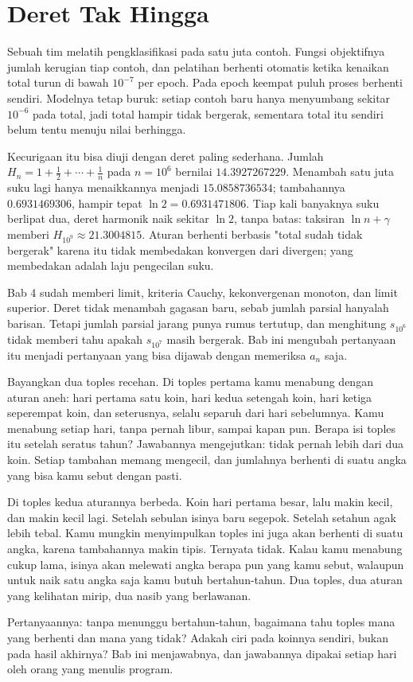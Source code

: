 \chapter{Deret Tak Hingga}

Sebuah tim melatih pengklasifikasi pada satu juta contoh. Fungsi objektifnya jumlah
kerugian tiap contoh, dan pelatihan berhenti otomatis ketika kenaikan total turun di
bawah $10^{-7}$ per epoch. Pada epoch keempat puluh proses berhenti sendiri. Modelnya
tetap buruk: setiap contoh baru hanya menyumbang sekitar $10^{-6}$ pada total, jadi
total hampir tidak bergerak, sementara total itu sendiri belum tentu menuju nilai
berhingga.

Kecurigaan itu bisa diuji dengan deret paling sederhana. Jumlah
$H_n = 1 + \tfrac{1}{2} + \cdots + \tfrac{1}{n}$ pada $n=10^6$ bernilai
$14.3927267229$. Menambah satu juta suku lagi hanya menaikkannya menjadi
$15.0858736534$; tambahannya $0.6931469306$, hampir tepat $\ln 2 = 0.6931471806$.
Tiap kali banyaknya suku berlipat dua, deret harmonik naik sekitar $\ln 2$, tanpa
batas: taksiran $\ln n + \gamma$ memberi $H_{10^9} \approx 21.3004815$. Aturan
berhenti berbasis "total sudah tidak bergerak" karena itu tidak membedakan konvergen
dari divergen; yang membedakan adalah laju pengecilan suku.

Bab 4 sudah memberi limit, kriteria Cauchy, kekonvergenan monoton, dan limit superior.
Deret tidak menambah gagasan baru, sebab jumlah parsial hanyalah barisan. Tetapi jumlah
parsial jarang punya rumus tertutup, dan menghitung $s_{10^6}$ tidak memberi tahu apakah
$s_{10^7}$ masih bergerak. Bab ini mengubah pertanyaan itu menjadi pertanyaan yang bisa
dijawab dengan memeriksa $a_n$ saja.

\begin{untukanak}
Bayangkan dua toples recehan. Di toples pertama kamu menabung dengan aturan aneh:
hari pertama satu koin, hari kedua setengah koin, hari ketiga seperempat koin, dan
seterusnya, selalu separuh dari hari sebelumnya. Kamu menabung setiap hari, tanpa
pernah libur, sampai kapan pun. Berapa isi toples itu setelah seratus tahun? Jawabannya
mengejutkan: tidak pernah lebih dari dua koin. Setiap tambahan memang mengecil, dan
jumlahnya berhenti di suatu angka yang bisa kamu sebut dengan pasti.

Di toples kedua aturannya berbeda. Koin hari pertama besar, lalu makin kecil, dan
makin kecil lagi. Setelah sebulan isinya baru segepok. Setelah setahun agak lebih
tebal. Kamu mungkin menyimpulkan toples ini juga akan berhenti di suatu angka, karena
tambahannya makin tipis. Ternyata tidak. Kalau kamu menabung cukup lama, isinya akan
melewati angka berapa pun yang kamu sebut, walaupun untuk naik satu angka saja kamu
butuh bertahun-tahun. Dua toples, dua aturan yang kelihatan mirip, dua nasib yang
berlawanan.

Pertanyaannya: tanpa menunggu bertahun-tahun, bagaimana tahu toples mana yang berhenti
dan mana yang tidak? Adakah ciri pada koinnya sendiri, bukan pada hasil akhirnya? Bab
ini menjawabnya, dan jawabannya dipakai setiap hari oleh orang yang menulis program.
\end{untukanak}

